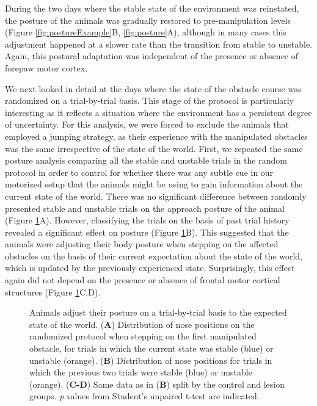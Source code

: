 During the two days where the stable state of the environment was reinstated, the posture of the animals was gradually restored to pre-manipulation levels (Figure \ref{fig:postureExample}B, \ref{fig:posture}A), although in many cases this adjustment happened at a slower rate than the transition from stable to unstable. Again, this postural adaptation was independent of the presence or absence of forepaw motor cortex.

We next looked in detail at the days where the state of the obstacle course was randomized on a trial-by-trial basis. This stage of the protocol is particularly interesting as it reflects a situation where the environment has a persistent degree of uncertainty. For this analysis, we were forced to exclude the animals that employed a jumping strategy, as their experience with the manipulated obstacles was the same irrespective of the state of the world. First, we repeated the same posture analysis comparing all the stable and unstable trials in the random protocol in order to control for whether there was any subtle cue in our motorized setup that the animals might be using to gain information about the current state of the world. There was no significant difference between randomly presented stable and unstable trials on the approach posture of the animal (Figure \ref{fig:random}A). However, classifying the trials on the basis of past trial history revealed a significant effect on posture (Figure \ref{fig:random}B). This suggested that the animals were adjusting their body posture when stepping on the affected obstacles on the basis of their current expectation about the state of the world, which is updated by the previously experienced state. Surprisingly, this effect again did not depend on the presence or absence of frontal motor cortical structures (Figure \ref{fig:random}C,D).

\begin{figure}
\centering

\caption{Animals adjust their posture on a trial-by-trial basis to the expected state of the world. (\textbf{A}) Distribution of nose positions on the randomized protocol when stepping on the first manipulated obstacle, for trials in which the current state was stable (blue) or unstable (orange). (\textbf{B}) Distribution of nose positions for trials in which the previous two trials were stable (blue) or unstable (orange). (\textbf{C-D}) Same data as in (\textbf{B}) split by the control and lesion groups. \emph{p} values from Student's unpaired t-test are indicated.}
\label{fig:random}
\end{figure}

